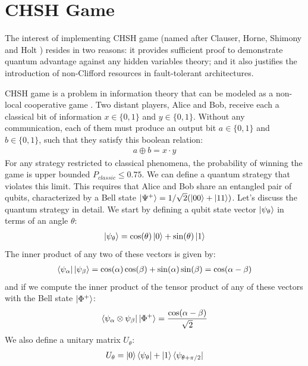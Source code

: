 \documentclass[12pt, twoside, openany]{book}
\begin{document}
\section{CHSH Game}

The interest of implementing CHSH game (named after Clauser, Horne, Shimony and Holt \cite{CHSH}) resides in two reasons: it provides sufficient proof to demonstrate quantum advantage against any hidden variables theory; and it also justifies the introduction of non-Clifford resources in fault-tolerant architectures.

CHSH game is a problem in information theory that can be modeled as a non-local cooperative game \cite{watrous2025understandingquantuminformationcomputation}. Two distant players, Alice and Bob, receive each a classical bit of information $x \in \{ 0,1 \}$ and $y \in \{ 0,1 \}$. Without any communication, each of them must produce an output bit $a \in \{ 0,1 \}$ and $b \in \{ 0,1 \}$, such that they satisfy this boolean relation:
\begin{align*}
    a \oplus b = x \cdot y
\end{align*}
For any strategy restricted to classical phenomena, the probability of winning the game is upper bounded $P_{classic} \leq 0.75$. We can define a quantum strategy that violates this limit. This requires that Alice and Bob share an entangled pair of qubits, characterized by a Bell state $\ket{\Psi ^+} = 1/\sqrt{2}(\ket{00} + \ket{11})$. Let's discuss the quantum strategy in detail. We start by defining a qubit state vector $\ket{\psi_{\theta}}$ in terms of an angle $\theta$:
\begin{align*}
    \ket{\psi_{\theta}} = \cos(\theta) \ket{0} + \sin(\theta) \ket{1}
\end{align*}
The inner product of any two of these vectors is given by:
\begin{align*}
    \bra{\psi_{\alpha}} \ket{\psi_{\beta}} = \cos(\alpha) \cos(\beta) + \sin(\alpha) \sin(\beta) = \cos(\alpha - \beta)
\end{align*}
and if we compute the inner product of the tensor product of any of these vectors with the Bell state $\ket{\Phi^+}$:
\begin{align} \label{inner_product_CHSH}
    \bra{\psi_{\alpha} \otimes \psi_{\beta}} \ket{\Phi^+} = \frac{\cos(\alpha - \beta)}{\sqrt{2}}
\end{align}
We also define a unitary matrix $U_\theta$:
\begin{align*}
    U_\theta = \ket{0} \bra{\psi_\theta} + \ket{1} \bra{\psi_{\theta+\pi/2}}
\end{align*}
\end{document}
